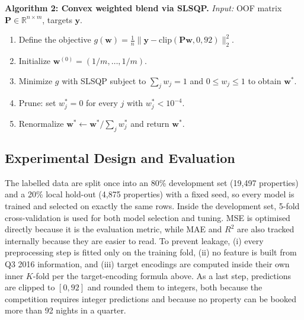 \documentclass[journal]{IEEEtran}
\begin{document}
\vspace{2pt}
\noindent\textbf{Algorithm 2: Convex weighted blend via SLSQP.}
\emph{Input:} OOF matrix $\mathbf{P}\in\mathbb{R}^{n\times m}$, targets
$\mathbf{y}$.
\begin{enumerate}
\item Define the objective
$g(\mathbf{w})=\frac{1}{n}\lVert\mathbf{y}-\mathrm{clip}(\mathbf{P}\mathbf{w},0,92)\rVert_2^2$.
\item Initialize $\mathbf{w}^{(0)}=(1/m,\dots,1/m)$.
\item Minimize $g$ with SLSQP subject to $\sum_j w_j=1$ and $0\le w_j\le1$ to
obtain $\mathbf{w}^{*}$.
\item Prune: set $w_j^{*}=0$ for every $j$ with $w_j^{*}<10^{-4}$.
\item Renormalize $\mathbf{w}^{*}\leftarrow\mathbf{w}^{*}/\sum_j w_j^{*}$ and
return $\mathbf{w}^{*}$.
\end{enumerate}
\vspace{2pt}

\subsection{Experimental Design and Evaluation}
The labelled data are split once into an 80\% development set (19{,}497
properties) and a 20\% local hold-out (4{,}875 properties) with a fixed seed, so
every model is trained and selected on exactly the same rows. Inside the
development set, 5-fold cross-validation is used for both model selection and
tuning. MSE is optimised directly because it is the evaluation
metric, while MAE and $R^2$ are also tracked internally because they are easier to
read. To prevent leakage, (i) every preprocessing step is fitted only on
the training fold, (ii) no feature is built from Q3 2016 information, and (iii)
target encodings are computed inside their own inner $K$-fold per
the target-encoding formula above. As a last step, predictions are clipped to $[0,92]$ and rounded
them to integers, both because the competition requires integer predictions and
because no property can be booked more than 92 nights in a quarter.
\end{document}

